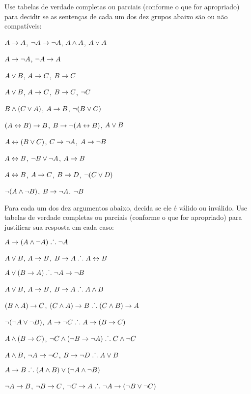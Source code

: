 \noindent\problempart
\label{pr.TT.satisfiable5}
Use tabelas de verdade completas ou parciais (conforme o que for apropriado) para decidir se as sentenças de cada um dos dez grupos abaixo são ou não compatíveis:
\begin{earg}
\item $A\rightarrow A$, $\neg A \rightarrow \neg A$, $A\wedge A$, $A\vee A$ %
\item $A \rightarrow \neg A$, $\neg A \rightarrow A$%
\item $A\vee B$, $A\rightarrow C$, $B\rightarrow C$ %
\item $A \vee B$, $A \rightarrow C$, $B \rightarrow C$, $\neg C$ %
\item $B\wedge(C\vee A)$, $A\rightarrow B$, $\neg(B\vee C)$  %
\item $(A \leftrightarrow B) \rightarrow B$,  $B \rightarrow \neg (A \leftrightarrow B)$, $A \vee B$  %
\item $A\leftrightarrow(B\vee C)$, $C\rightarrow \neg A$, $A\rightarrow \neg B$ %
\item  $A \leftrightarrow B$,  $\neg B \vee \neg A$,  $A \rightarrow  B$ %
\item $A \leftrightarrow B$, $A \rightarrow C$, $B \rightarrow D$, $\neg(C \vee D)$ %
\item $\neg (A \wedge \neg B)$,  $B \rightarrow \neg A$, $\neg B$   %
\end{earg}

\noindent\problempart 
Para cada um dos dez argumentos abaixo, decida se ele é válido ou inválido.
Use tabelas de verdade completas ou parciais (conforme o que for apropriado) para justificar sua resposta em cada caso:
\label{pr.TT.valid5} 
\begin{earg}
\item $A\rightarrow(A\wedge\neg A)\mathrel{\ldotp\dot{}\,\ldotp} \neg A$%
\item $A \vee B$, $A \rightarrow B$, $B \rightarrow A \mathrel{\ldotp\dot{}\,\ldotp}  A \leftrightarrow B$  %
\item $A\vee(B\rightarrow A)\mathrel{\ldotp\dot{}\,\ldotp} \neg A \rightarrow \neg B$ %
\item $A \vee B$, $A \rightarrow B$, $ B \rightarrow A \mathrel{\ldotp\dot{}\,\ldotp}  A \wedge B$ %
\item $(B\wedge A)\rightarrow C$, $(C\wedge A)\rightarrow B\mathrel{\ldotp\dot{}\,\ldotp} (C\wedge B)\rightarrow A$ %
\item $\neg (\neg A \vee \neg B)$, $A \rightarrow \neg C \mathrel{\ldotp\dot{}\,\ldotp}  A \rightarrow (B \rightarrow C)$ %
\item $A \wedge (B \rightarrow C)$, $\neg C \wedge (\neg B \rightarrow \neg A)\mathrel{\ldotp\dot{}\,\ldotp} C \wedge \neg C$ %
\item $A \wedge B$, $\neg A \rightarrow \neg C$, $B \rightarrow \neg D \mathrel{\ldotp\dot{}\,\ldotp}  A \vee B$ %
\item $A \rightarrow B\mathrel{\ldotp\dot{}\,\ldotp} (A \wedge B) \vee (\neg A \wedge \neg B)$ %
\item $\neg A \rightarrow B$, $ \neg B \rightarrow C $, $ \neg C \rightarrow A \mathrel{\ldotp\dot{}\,\ldotp}  \neg A \rightarrow (\neg B \vee \neg C) $%

\end{earg}

